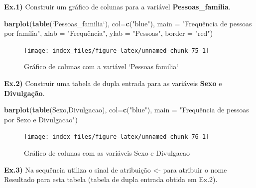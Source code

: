\documentclass[12pt,brazil,oneside]{book}
\newenvironment{Shaded}{\begin{snugshade}}{\end{snugshade}}
\newcommand{\DataTypeTok}[1]{\textcolor[rgb]{0.13,0.29,0.53}{#1}}
\newcommand{\KeywordTok}[1]{\textcolor[rgb]{0.13,0.29,0.53}{\textbf{#1}}}
\newcommand{\NormalTok}[1]{#1}
\newcommand{\StringTok}[1]{\textcolor[rgb]{0.31,0.60,0.02}{#1}}
\begin{document}
\textbf{Ex.1)} Construir um gráfico de colunas para a variável \textbf{Pessoas\_familia}.

\begin{Shaded}
\begin{Highlighting}[]
\KeywordTok{barplot}\NormalTok{(}\KeywordTok{table}\NormalTok{(}\StringTok{`}\DataTypeTok{Pessoas_familia}\StringTok{`}\NormalTok{), }\DataTypeTok{col=}\KeywordTok{c}\NormalTok{(}\StringTok{"blue"}\NormalTok{), }
        \DataTypeTok{main =} \StringTok{"Frequência de pessoas por família"}\NormalTok{, }
        \DataTypeTok{xlab =} \StringTok{"Frequência", }
\StringTok{        ylab = "}\NormalTok{Pessoas}\StringTok{", }
\StringTok{        border = "}\NormalTok{red}\StringTok{")}
\end{Highlighting}
\end{Shaded}

\begin{figure}[H]

{\centering \texttt{[image: index\_files/figure-latex/unnamed-chunk-75-1]} 

}

\caption{Gráfico de colunas com a variável `Pessoas familia`}\label{fig:unnamed-chunk-75}
\end{figure}

\textbf{Ex.2)} Construir uma tabela de dupla entrada para as variáveis \textbf{Sexo} e \textbf{Divulgação}.

\begin{Shaded}
\begin{Highlighting}[]
\KeywordTok{barplot}\NormalTok{(}\KeywordTok{table}\NormalTok{(Sexo,Divulgacao), }
        \DataTypeTok{col=}\KeywordTok{c}\NormalTok{(}\StringTok{"blue"}\NormalTok{), }
        \DataTypeTok{main =} \StringTok{"Frequência de pessoas por Sexo e Divulgacao"}\NormalTok{)}
\end{Highlighting}
\end{Shaded}

\begin{figure}[H]

{\centering \texttt{[image: index\_files/figure-latex/unnamed-chunk-76-1]} 

}

\caption{Gráfico de colunas com as variáveis Sexo e Divulgacao}\label{fig:unnamed-chunk-76}
\end{figure}

\textbf{Ex.3)} Na sequência utiliza o sinal de atribuição \textless{}- para atribuir o nome Resultado para esta tabela (tabela de dupla entrada obtida em Ex.2).
\end{document}
